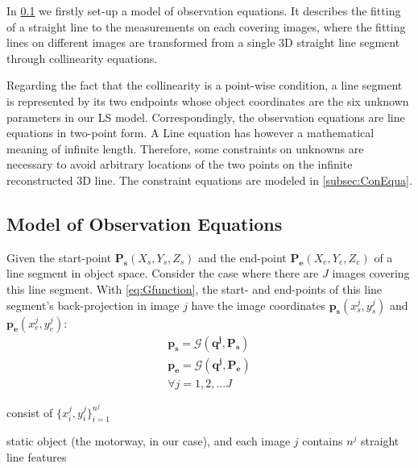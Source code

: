 In \cref{subsec:ObsEqua} we firstly set-up a model of observation equations. It describes the fitting of a straight line to the measurements on each covering images, where the fitting lines on different images are transformed from a single 3D straight line segment through collinearity equations. 

Regarding the fact that the collinearity is a point-wise condition, a line segment is represented by its two endpoints whose object coordinates are the six unknown parameters in our LS model. Correspondingly, the observation equations are line equations in two-point form. A Line equation has however a mathematical meaning of infinite length. Therefore, some constraints on unknowns are necessary to avoid arbitrary locations of the two points on the infinite reconstructed 3D line. The constraint equations are modeled in \cref{subsec:ConEqua}.





\subsection{Model of Observation Equations}
\label{subsec:ObsEqua}

Given the start-point $\mathbf{P_s}(X_s,Y_s,Z_s)$ and the end-point $\mathbf{P_e}(X_e,Y_e,Z_e)$ of a line segment in object space. Consider the case where there are $J$ images covering this line segment. With \cref{eq:Gfunction}, the start- and end-points of this line segment's back-projection in image $j$ have the image coordinates $\mathbf{p_s}(x^j_s,y^j_s)$ and $\mathbf{p_e}(x^j_e,y^j_e)$:
\begin{equation} \label{eq:obsmodel-collinearity}
\begin{split}
\mathbf{p_s} = \mathcal{G}(\mathbf{q^j},\mathbf{P_s})\\
\mathbf{p_e} = \mathcal{G}(\mathbf{q^j},\mathbf{P_e})\\
\forall j=1,2,...J
\end{split}
\end{equation}







consist of $\{x^j_i,y^j_i\}^{n^j}_{i=1}$

 static object (the motorway, in our case), and each image $j$ contains $n^j$ straight line features


